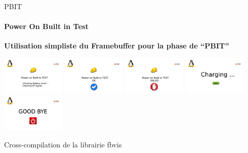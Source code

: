 \documentclass[11pt]{beamer}
\begin{document}
	\begin{frame}{PBIT}
	\framesubtitle{Power On Built in Test}
	\centering \textbf{Utilisation simpliste du Framebuffer pour la phase de ``PBIT''}
	 \newline
	 \begin{center}
	  \includegraphics[width=3cm]{common/PBIT1.png}
	 \includegraphics[width=3cm]{common/PBIT2.png}
	 \includegraphics[width=3cm]{common/PBIT3.png}
	 \newline
	 \includegraphics[width=3cm]{common/PBIT4.png}
	 \includegraphics[width=3cm]{common/PBIT5.png}
	\begin{block}

			\centering Cross-compilation de la librairie fbvis
	\end{block}
	 \end{center}


	\end{frame}
\end{document}
